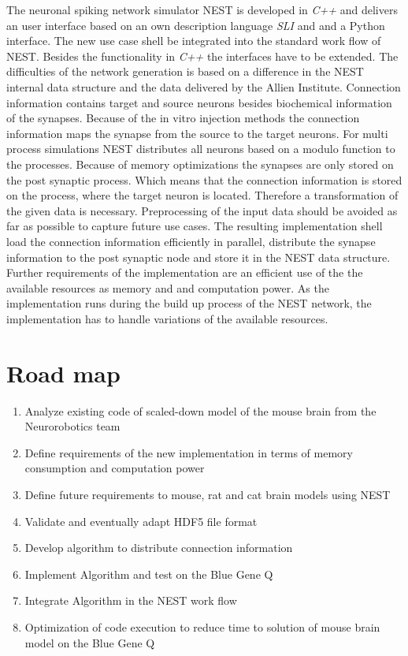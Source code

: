 \documentclass[a4paper]{article}
\begin{document}
The neuronal spiking network simulator NEST is developed in \emph{C++} and delivers
an user interface based on an own description language \emph{SLI} and  and a Python interface.
The new use case shell be integrated into the standard work flow of NEST.
Besides the functionality in \emph{C++} the interfaces have to be extended.
The difficulties of the network generation is based on a difference in 
the NEST internal data structure and the data delivered by the Allien Institute.
Connection information contains target and source neurons besides biochemical
information of the synapses. Because of the in vitro injection methods the
connection information maps the synapse from the source to the target neurons.
For multi process simulations NEST distributes all neurons based on a modulo function 
to the processes. Because of memory optimizations the synapses are only stored on the
post synaptic process. Which means that the connection information is stored
on the process, where the target neuron is located. Therefore a transformation of the given data is
necessary. Preprocessing of the input data should be avoided as far as possible to capture
future use cases.
The resulting implementation shell load the connection information efficiently in parallel,
distribute the synapse information to the post synaptic node and store it in
the NEST data structure.
Further requirements of the implementation are an efficient use of the the available resources as
memory and and computation power. As the implementation runs during the build up process of the
NEST network, the implementation has to handle variations of the available resources. 

\newpage
\section{Road map}
\begin{enumerate}
    \item Analyze existing code of scaled-down model of the mouse brain from the Neurorobotics team
    \item Define requirements of the new implementation in terms of memory consumption and computation power
    \item Define future requirements to mouse, rat and cat brain models using NEST
    \item Validate and eventually adapt HDF5 file format
    \item Develop algorithm to distribute connection information
    \item Implement Algorithm and test on the Blue Gene Q
    \item Integrate Algorithm in the NEST work flow
    \item Optimization of code execution to reduce time to solution of mouse brain model on the Blue Gene Q
\end{enumerate}
\end{document}
